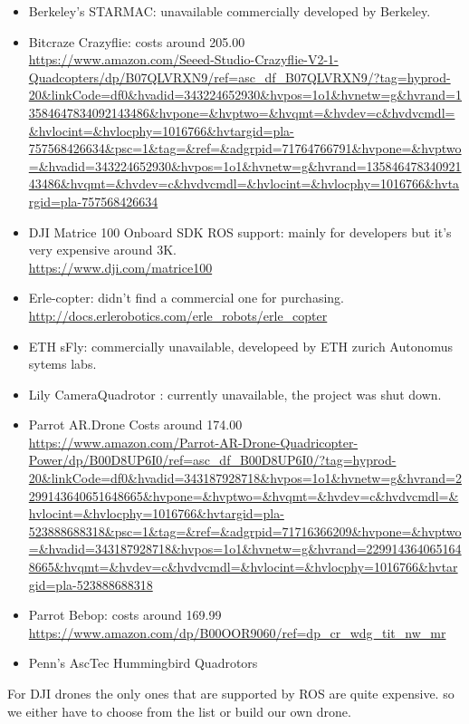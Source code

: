 \documentclass[fontsize=11pt, %
                             paper=letter, %
                             twoside, %
                             captions=tableheading,
                             index=totoc,
                             hyperref]{labbook}
\begin{document}
\begin{addmargin}[0cm]{0cm}
\begin{itemize}
\item Berkeley’s STARMAC: unavailable commercially developed by Berkeley. 
\item Bitcraze Crazyflie: costs around 205.00 
\\
\url {https://www.amazon.com/Seeed-Studio-Crazyflie-V2-1-Quadcopters/dp/B07QLVRXN9/ref=asc_df_B07QLVRXN9/?tag=hyprod-20&linkCode=df0&hvadid=343224652930&hvpos=1o1&hvnetw=g&hvrand=13584647834092143486&hvpone=&hvptwo=&hvqmt=&hvdev=c&hvdvcmdl=&hvlocint=&hvlocphy=1016766&hvtargid=pla-757568426634&psc=1&tag=&ref=&adgrpid=71764766791&hvpone=&hvptwo=&hvadid=343224652930&hvpos=1o1&hvnetw=g&hvrand=13584647834092143486&hvqmt=&hvdev=c&hvdvcmdl=&hvlocint=&hvlocphy=1016766&hvtargid=pla-757568426634
}
\item DJI Matrice 100 Onboard SDK ROS support: mainly for developers but it's very expensive around 3K.
\\
\url {https://www.dji.com/matrice100}
\item Erle-copter: didn't find a commercial one for purchasing. 
\\
\url {http://docs.erlerobotics.com/erle_robots/erle_copter}

\item ETH sFly: commercially unavailable, developeed by ETH zurich Autonomus sytems labs. 
\item Lily CameraQuadrotor : currently unavailable, the project was shut down. 
\item Parrot AR.Drone
Costs around 174.00 
\\
\url{
https://www.amazon.com/Parrot-AR-Drone-Quadricopter-Power/dp/B00D8UP6I0/ref=asc_df_B00D8UP6I0/?tag=hyprod-20&linkCode=df0&hvadid=343187928718&hvpos=1o1&hvnetw=g&hvrand=2299143640651648665&hvpone=&hvptwo=&hvqmt=&hvdev=c&hvdvcmdl=&hvlocint=&hvlocphy=1016766&hvtargid=pla-523888688318&psc=1&tag=&ref=&adgrpid=71716366209&hvpone=&hvptwo=&hvadid=343187928718&hvpos=1o1&hvnetw=g&hvrand=2299143640651648665&hvqmt=&hvdev=c&hvdvcmdl=&hvlocint=&hvlocphy=1016766&hvtargid=pla-523888688318
}
\item Parrot Bebop: costs around 169.99
\\
\url{https://www.amazon.com/dp/B00OOR9060/ref=dp_cr_wdg_tit_nw_mr} 

\item Penn’s AscTec Hummingbird Quadrotors


\end{itemize}

For DJI drones the only ones that are supported by ROS are quite expensive. so we either have to choose from the list or build our own drone. 

\end{addmargin}
\end{document}
